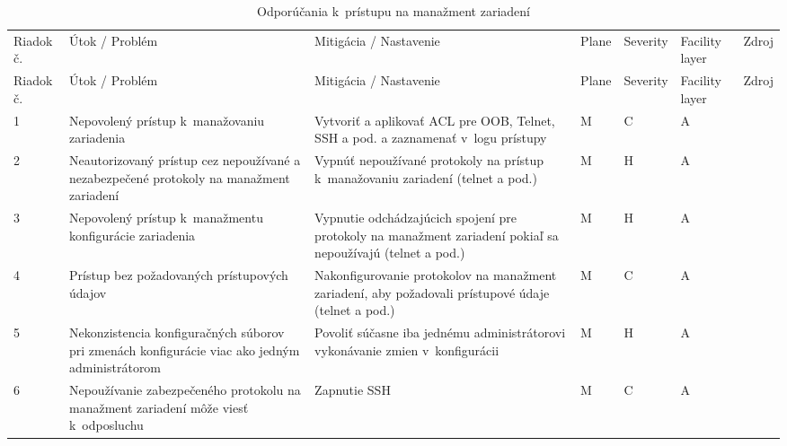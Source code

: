 
\newpage


\footnotesize
{}

\begin{longtable}[!htbp]{|C{2.5em}L{11em}L{11em}C{2.5em}C{4em}C{5em}L{2.5em}|}
	\caption{Odporúčania k~prístupu na manažment zariadení}
	\label{tab:managemnet}\\ \hline
	\mbox{Riadok} č.&Útok / Problém	&Mitigácia / Nastavenie	& Plane 	&Severity	&Facility layer	&Zdroj\\ \hhline{=======}
	\endfirsthead 
	\hline
	\centering
	
	Riadok č.	&Útok / Problém	&Mitigácia / Nastavenie	&Plane	&Severity	&Facility layer	&Zdroj\\ \hhline{=======}
	\endhead
	
	 1	&Nepovolený prístup k~manažovaniu zariadenia	&Vytvoriť a aplikovať ACL pre OOB, Telnet, SSH a pod. a zaznamenať v~logu prístupy	&M	&C	&A	& \cite{Akin2002}
	
	\cite{CIS_DrTLsgXv24lxeIIM}	\\
	2	&Neautorizovaný prístup cez nepoužívané a nezabezpečené protokoly na manažment zariadení	&Vypnúť nepoužívané protokoly na prístup k~manažovaniu zariadení (telnet a pod.)	&M	&H	&A	& \cite{CIS_DrTLsgXv24lxeIIM}
	
	\cite{Singh2018}
	\\
	 3	&Nepovolený prístup k~manažmentu konfigurácie zariadenia	&Vypnutie odchádzajúcich spojení pre protokoly na manažment zariadení pokiaľ sa nepoužívajú (telnet a pod.)	&M	&H	&A	& \cite{Singh2018}	\\
	4	&Prístup bez požadovaných prístupových údajov	&Nakonfigurovanie protokolov na manažment zariadení, aby požadovali prístupové údaje (telnet a pod.)	&M	&C	&A	& \cite{CIS_DrTLsgXv24lxeIIM}	\\
	 5	&Nekonzistencia konfiguračných súborov pri zmenách konfigurácie viac ako jedným administrátorom	&Povoliť súčasne iba jednému administrátorovi vykonávanie zmien v~konfigurácii	&M	&H	&A	& \cite{Singh2018}	\\
	6	&Nepoužívanie zabezpečeného protokolu na manažment zariadení môže viesť k~odposluchu	&Zapnutie SSH	&M	&C	&A	& \cite{CIS_DrTLsgXv24lxeIIM}
	

\end{longtable}
